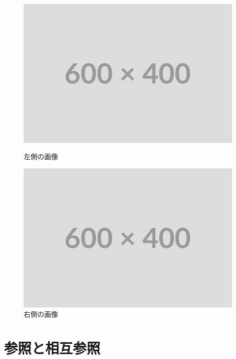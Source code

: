 \documentclass[11pt,a4paper,dvipdfmx,twocolumn]{jarticle}
\begin{document}
\begin{figure}[H]
    \centering
    \begin{minipage}{0.45\columnwidth}
        \centering
        \includegraphics[width=\textwidth]{images/placeholder.png}
        \caption{左側の画像}
        \label{fig:sample2a}
    \end{minipage}
    \hfill
    \begin{minipage}{0.45\columnwidth}
        \centering
        \includegraphics[width=\textwidth]{images/placeholder.png}
        \caption{右側の画像}
        \label{fig:sample2b}
    \end{minipage}
\end{figure}

\section{参照と相互参照}
\end{document}
